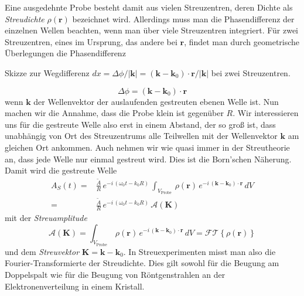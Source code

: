 Eine ausgedehnte Probe besteht damit aus vielen Streuzentren, deren Dichte als \emph{Streudichte} $\rho(\mathbf{r})$ bezeichnet wird. Allerdings muss man die Phasendifferenz der einzelnen Wellen beachten, wenn man über viele Streuzentren integriert. Für zwei Streuzentren, eines im Ursprung, das andere bei $\mathbf{r}$, findet man durch geometrische Überlegungen die Phasendifferenz
%
\begin{marginfigure}
\caption{Skizze zur  Wegdifferenz $dx =  \Delta \phi / | \mathbf{k}|=  ( \mathbf{k} - \mathbf{k}_0 ) \cdot \mathbf{r} / |\mathbf{k}| $ bei zwei Streuzentren.}
\end{marginfigure}
%
\begin{equation}
\Delta \phi = ( \mathbf{k} - \mathbf{k}_0 ) \cdot \mathbf{r}
\end{equation}
wenn $\mathbf{k}$ der Wellenvektor der auslaufenden gestreuten ebenen Welle ist. Nun machen wir die Annahme, dass die Probe klein ist gegenüber $R$. Wir interessieren uns für die gestreute Welle also erst in einem Abstand, der so groß ist, dass unabhängig von Ort des Streuzentrums alle Teilwellen mit der Wellenvektor $\mathbf{k}$ am gleichen Ort ankommen. Auch nehmen wir wie quasi immer in der Streutheorie an, dass jede Welle nur einmal gestreut wird. Dies ist die  Born'schen Näherung. Damit wird die gestreute Welle
\begin{align}
 A_S(t) = & \frac{\tilde{A}}{R} \,   e^{- i \, (\omega_0 t - k_0 R)} \,
  \int_{V_\text{Probe}} \, \rho( \mathbf{r}) \,   e^{- i \,  ( \mathbf{k} - \mathbf{k}_0 ) \cdot \mathbf{r}} \, dV \\
  = & \frac{\tilde{A}}{R} \,   e^{- i \, (\omega_0 t - k_0 R)} \, \mathcal{A}(\mathbf{K})
\end{align}
mit der \emph{Streuamplitude} 
\begin{equation}
\mathcal{A}(\mathbf{K}) =  \int_{V_\text{Probe}} \, \rho( \mathbf{r}) \,   e^{- i \,  ( \mathbf{k} - \mathbf{k}_0 ) \cdot \mathbf{r}} \, dV  = \mathcal{FT} \left\{ \rho( \mathbf{r})  \right\} \label{eq:rezi_streuamplitude}
\end{equation}
und dem \emph{Streuvektor} $\mathbf{K} = \mathbf{k} - \mathbf{k}_0$. In Streuexperimenten misst man also die Fourier-Transformierte der Streudichte. Dies gilt sowohl für die Beugung am Doppelspalt wie für die Beugung von Röntgenstrahlen an der Elektronenverteilung in einem Kristall. 

